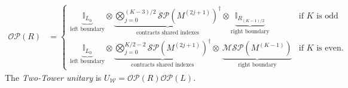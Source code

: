 \documentclass[a4paper,UKenglish,cleveref,autoref,thm-restate]{socg-lipics-v2021}
\newcommand{\SP}{\mathcal{SP}}        %
\newcommand{\MSP}{\mathcal{MSP}} %
\newcommand{\OP}{\mathcal{OP}}        %
\newcommand{\Id}{\mathbb{I}}         %
\begin{document}
\begin{definition}
\begin{align}
    \OP(R) &= \left\{\begin{array}{ll} \underbrace{\Id_{L_0}}_{\text{left boundary}}
              \otimes
              \underbrace{\bigotimes_{j=0}^{(K-3)/2} \SP\!\left(M^{(2j+1)}\right)^\dagger}_{\text{contracts shared indexes}}
              \otimes
              \underbrace{\Id_{R_{(K-1)/2}}}_{\text{right boundary}} & \mbox{if $K$ is odd}\\
              \underbrace{\Id_{L_0}}_{\text{left boundary}}
              \otimes
              \underbrace{\bigotimes_{j=0}^{K/2-2}\SP\!\left(M^{(2j+1)}\right)^\dagger}_{\text{contracts shared indexes}}
              \otimes \
              \underbrace{\MSP(M^{(K-1)})}_{\text{right boundary}} & \mbox{if $K$ is even}.
              \end{array}
    \right.
    \label{eq:OPR}
  \end{align}
  The \emph{Two-Tower unitary} is $U_\mathcal{W} = \OP(R)\OP(L)$.
\end{definition}
\end{document}
